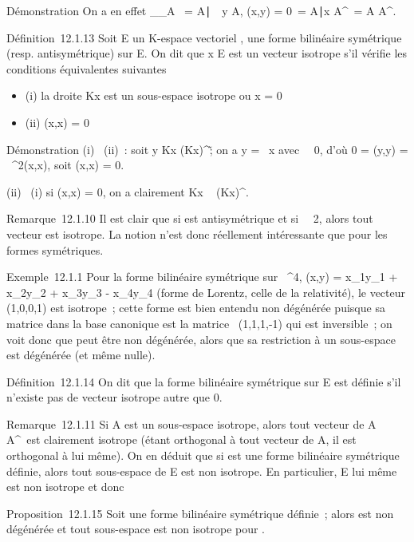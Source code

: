\documentclass[]{article}
\begin{document}
Démonstration On a en effet
\mathrmKer\phi\_\textbar{}\_A\timesA~
= \x \in
A∣\forall~~y \in A, \phi(x,y) =
0\ = \x \in
A∣x \in A^\bot\ = A \bigcap
A^\bot.

Définition~12.1.13 Soit E un K-espace vectoriel , \phi une forme bilinéaire
symétrique (resp. antisymétrique) sur E. On dit que x \in E est un vecteur
isotrope s'il vérifie les conditions équivalentes suivantes

\begin{itemize}
\itemsep1pt\parskip0pt
\item
  (i) la droite Kx est un sous-espace isotrope ou x = 0
\item
  (ii) \phi(x,x) = 0
\end{itemize}

Démonstration (i) \rigtharrow~(ii)~: soit y \in Kx \bigcap
(Kx)^\bot\diagdown\0\~; on a y = \lambda~x
avec \lambda~\neq~0, d'où 0 = \phi(y,y) =
\lambda~^2\phi(x,x), soit \phi(x,x) = 0.

(ii) \rigtharrow~(i) si \phi(x,x) = 0, on a clairement Kx \subset~ (Kx)^\bot.

Remarque~12.1.10 Il est clair que si \phi est antisymétrique et si
\mathrmcarK\mathrel\neq~~2,
alors tout vecteur est isotrope. La notion n'est donc réellement
intéressante que pour les formes symétriques.

Exemple~12.1.1 Pour la forme bilinéaire symétrique sur ~^4,
\phi(x,y) = x\_1y\_1 + x\_2y\_2 +
x\_3y\_3 - x\_4y\_4 (forme de Lorentz,
celle de la relativité), le vecteur (1,0,0,1) est isotrope~; cette forme
est bien entendu non dégénérée puisque sa matrice dans la base canonique
est la matrice
\mathrmdiag~(1,1,1,-1) qui
est inversible~; on voit donc que \phi peut être non dégénérée, alors que
sa restriction à un sous-espace est dégénérée (et même nulle).

Définition~12.1.14 On dit que la forme bilinéaire symétrique \phi sur E est
définie s'il n'existe pas de vecteur isotrope autre que 0.

Remarque~12.1.11 Si A est un sous-espace isotrope, alors tout vecteur de
A \bigcap A^\bot\diagdown\0\ est clairement
isotrope (étant orthogonal à tout vecteur de A, il est orthogonal à lui
même). On en déduit que si \phi est une forme bilinéaire symétrique
définie, alors tout sous-espace de E est non isotrope. En particulier, E
lui même est non isotrope et donc

Proposition~12.1.15 Soit \phi une forme bilinéaire symétrique définie~;
alors \phi est non dégénérée et tout sous-espace est non isotrope pour \phi.
\end{document}
